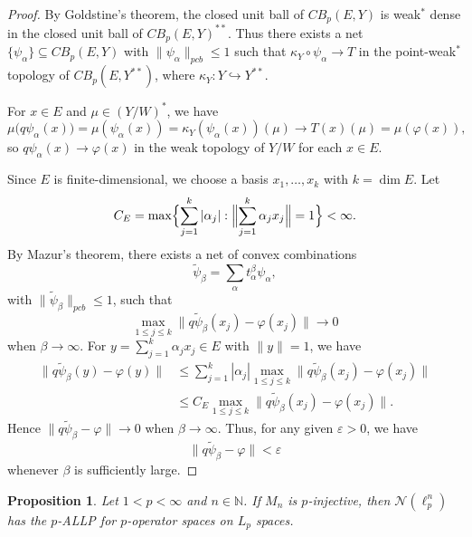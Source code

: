 \documentclass[12pt]{article}
\newtheorem{proposition}[theorem]{Proposition}
\newcommand{\pcb}{pcb}
\newcommand{\CBp}{CB_p}
\begin{document}
\begin{proof}
By Goldstine's theorem, the closed unit ball of $\CBp(E,Y)$ is
weak$^*$ dense in the closed unit ball of $\CBp(E,Y)^{**}$.
Thus there exists a net $\{\psi_\alpha\}\subseteq\CBp(E,Y)$ with
$\|\psi_\alpha\|_{\pcb}\leq 1$ such that
$\kappa_Y\circ\psi_\alpha\longrightarrow T$
in the point-weak$^*$ topology of $\CBp(E,Y^{**})$, where $\kappa_Y: Y\hookrightarrow Y^{**}$.

For $x\in E$ and $\mu\in (Y/W)^*$, we have
\[
        \mu\big(q\psi_\alpha(x)\big)
        =\mu(\psi_\alpha(x))
        =\kappa_Y(\psi_\alpha(x))(\mu)
        \longrightarrow T(x)(\mu)
        =\mu(\varphi(x)),
\]
so $q\psi_\alpha(x)\to\varphi(x)$ in the weak topology of $Y/W$ for each
$x\in E$.

Since $E$ is finite-dimensional, we choose a basis $x_1,\ldots,x_k$ with $k=\dim E$.
Let
\[
        C_E=\max\Bigl\{\sum_{j=1}^k|\alpha_j|:
        \Bigl\|\sum_{j=1}^k\alpha_j x_j\Bigr\|=1\Bigr\}<\infty.
\]
By Mazur's theorem, there exists a net of convex combinations
\[
        \widetilde\psi_\beta=\sum_\alpha t_\alpha^\beta \psi_\alpha,
\]
with $\|\widetilde\psi_\beta\|_{\pcb}\leq 1$, such that
\[
        \max_{1\leq j\leq k}
        \bigl\|q\widetilde\psi_\beta(x_j)-\varphi(x_j)\bigr\|
        \longrightarrow 0
\]
when $\beta\to\infty$.
For $y=\sum_{j=1}^k\alpha_j x_j\in E$ with $\|y\|=1$, we have
\begin{align*}
        \bigl\|q\widetilde\psi_\beta(y)-\varphi(y)\bigr\|
        &\leq\sum_{j=1}^k|\alpha_j|
        \max_{1\leq j\leq k}
        \bigl\|q\widetilde\psi_\beta(x_j)-\varphi(x_j)\bigr\| \\
        &\leq C_E
        \max_{1\leq j\leq k}
        \bigl\|q\widetilde\psi_\beta(x_j)-\varphi(x_j)\bigr\|.
\end{align*}
Hence $\|q\widetilde\psi_\beta-\varphi\|\to 0$ when $\beta\to\infty$.
Thus, for any given $\varepsilon>0$, we have
\[
        \|q\widetilde\psi_\beta-\varphi\|<\varepsilon
\]
whenever $\beta$ is sufficiently large.
\end{proof}


\begin{proposition}\label{prop:N-lpn-ALLP}
Let $1<p<\infty$ and $n\in\mathbb{N}$.
If $M_n$ is $p$-injective, then $\mathcal{N}(\ell_p^n)$ has the $p$-ALLP for $p$-operator spaces on $L_p$ spaces.
\end{proposition}
\end{document}
